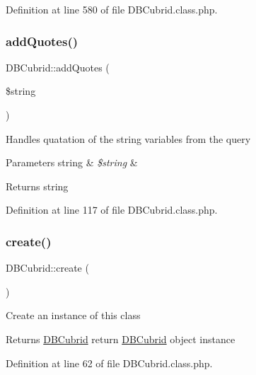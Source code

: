 Definition at line 580 of file D\+B\+Cubrid.\+class.\+php.

\mbox{\label{classDBCubrid_ab9aea745152a86b3852101aa3225f26d}} 
\subsubsection{\texorpdfstring{add\+Quotes()}{addQuotes()}}
{\footnotesize\ttfamily D\+B\+Cubrid\+::add\+Quotes (\begin{DoxyParamCaption}\item[{}]{\$string }\end{DoxyParamCaption})}

Handles quatation of the string variables from the query 
\begin{DoxyParams}[1]{Parameters}
string & {\em \$string} & \\
\hline
\end{DoxyParams}
\begin{DoxyReturn}{Returns}
string 
\end{DoxyReturn}


Definition at line 117 of file D\+B\+Cubrid.\+class.\+php.

\mbox{\label{classDBCubrid_a9a5f425a0abce46d33a6d713b7dd407f}} 
\subsubsection{\texorpdfstring{create()}{create()}}
{\footnotesize\ttfamily D\+B\+Cubrid\+::create (\begin{DoxyParamCaption}{ }\end{DoxyParamCaption})}

Create an instance of this class \begin{DoxyReturn}{Returns}
\hyperlink{classDBCubrid}{D\+B\+Cubrid} return \hyperlink{classDBCubrid}{D\+B\+Cubrid} object instance 
\end{DoxyReturn}


Definition at line 62 of file D\+B\+Cubrid.\+class.\+php.

\mbox{\label{classDBCubrid_a63b7c263f7626877bba41d7072562043}} 

